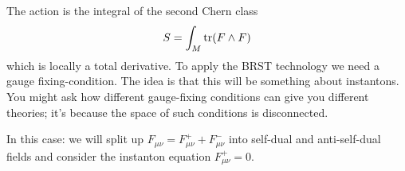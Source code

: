 The action is the integral of the second Chern class
\[
S = \int_M \operatorname{tr}(F \wedge F)
\]
which is locally a total derivative.
To apply the BRST technology we need a gauge fixing-condition.
The idea is that this will be something about instantons.
You might ask how different gauge-fixing conditions can give you different theories; it's because the space of such conditions is disconnected.

In this case: we will split up $F_{\mu \nu} = F_{\mu \nu}^+ + F_{\mu \nu}^-$ into self-dual and anti-self-dual fields and consider the instanton equation $F_{\mu \nu}^+ = 0$.